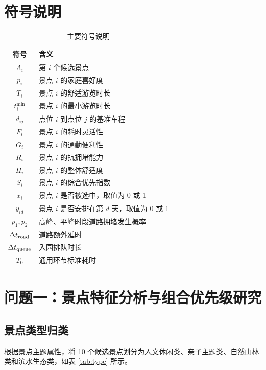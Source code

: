 \documentclass[UTF8,a4paper,12pt]{ctexart}
\begin{document}
\section{符号说明}

\begin{table}[H]
\centering
\caption{主要符号说明}
\begin{tabularx}{0.92\textwidth}{cX}
\toprule
符号 & 含义 \\
\midrule
$A_i$ & 第 $i$ 个候选景点 \\
$p_i$ & 景点 $i$ 的家庭喜好度 \\
$T_i$ & 景点 $i$ 的舒适游览时长 \\
$t_i^{\min}$ & 景点 $i$ 的最小游览时长 \\
$d_{ij}$ & 点位 $i$ 到点位 $j$ 的基准车程 \\
$F_i$ & 景点 $i$ 的耗时灵活性 \\
$G_i$ & 景点 $i$ 的通勤便利性 \\
$R_i$ & 景点 $i$ 的抗拥堵能力 \\
$H_i$ & 景点 $i$ 的整体舒适度 \\
$S_i$ & 景点 $i$ 的综合优先指数 \\
$x_i$ & 景点 $i$ 是否被选中，取值为 0 或 1 \\
$y_{id}$ & 景点 $i$ 是否安排在第 $d$ 天，取值为 0 或 1 \\
$p_1,p_2$ & 高峰、平峰时段道路拥堵发生概率 \\
$\Delta t_{\rm road}$ & 道路额外延时 \\
$\Delta t_{\rm queue}$ & 入园排队时长 \\
$T_0$ & 通用环节标准耗时 \\
\bottomrule
\end{tabularx}
\end{table}

\section{问题一：景点特征分析与组合优先级研究}

\subsection{景点类型归类}

根据景点主题属性，将 10 个候选景点划分为人文休闲类、亲子主题类、自然山林类和滨水生态类，如表 \ref{tab:type} 所示。
\end{document}
